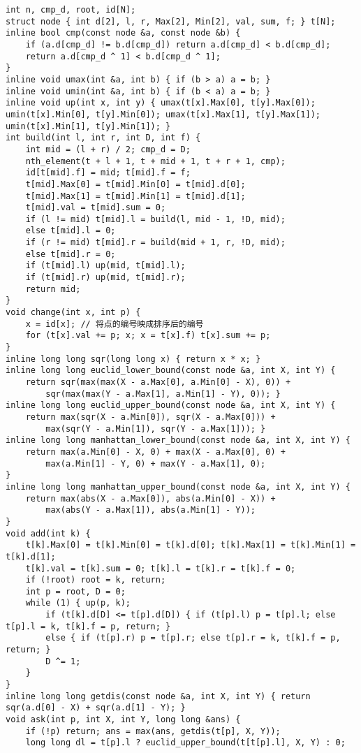 \documentclass[landscape,a4paper]{article}
\begin{document}
\begin{lstlisting}
int n, cmp_d, root, id[N];
struct node { int d[2], l, r, Max[2], Min[2], val, sum, f; } t[N];
inline bool cmp(const node &a, const node &b) {
	if (a.d[cmp_d] != b.d[cmp_d]) return a.d[cmp_d] < b.d[cmp_d];
	return a.d[cmp_d ^ 1] < b.d[cmp_d ^ 1];
}
inline void umax(int &a, int b) { if (b > a) a = b; }
inline void umin(int &a, int b) { if (b < a) a = b; }
inline void up(int x, int y) { umax(t[x].Max[0], t[y].Max[0]); umin(t[x].Min[0], t[y].Min[0]); umax(t[x].Max[1], t[y].Max[1]); umin(t[x].Min[1], t[y].Min[1]); }
int build(int l, int r, int D, int f) {
	int mid = (l + r) / 2; cmp_d = D;
	nth_element(t + l + 1, t + mid + 1, t + r + 1, cmp);
	id[t[mid].f] = mid; t[mid].f = f;
	t[mid].Max[0] = t[mid].Min[0] = t[mid].d[0];
	t[mid].Max[1] = t[mid].Min[1] = t[mid].d[1];
	t[mid].val = t[mid].sum = 0;
	if (l != mid) t[mid].l = build(l, mid - 1, !D, mid);
	else t[mid].l = 0;
	if (r != mid) t[mid].r = build(mid + 1, r, !D, mid);
	else t[mid].r = 0;
	if (t[mid].l) up(mid, t[mid].l);
	if (t[mid].r) up(mid, t[mid].r);
	return mid;
}
void change(int x, int p) {
	x = id[x]; // 将点的编号映成排序后的编号
	for (t[x].val += p; x; x = t[x].f) t[x].sum += p;
}
inline long long sqr(long long x) { return x * x; }
inline long long euclid_lower_bound(const node &a, int X, int Y) {
	return sqr(max(max(X - a.Max[0], a.Min[0] - X), 0)) +
		sqr(max(max(Y - a.Max[1], a.Min[1] - Y), 0)); }
inline long long euclid_upper_bound(const node &a, int X, int Y) {
	return max(sqr(X - a.Min[0]), sqr(X - a.Max[0])) +
		max(sqr(Y - a.Min[1]), sqr(Y - a.Max[1])); }
inline long long manhattan_lower_bound(const node &a, int X, int Y) {
	return max(a.Min[0] - X, 0) + max(X - a.Max[0], 0) + 
		max(a.Min[1] - Y, 0) + max(Y - a.Max[1], 0);
}
inline long long manhattan_upper_bound(const node &a, int X, int Y) {
	return max(abs(X - a.Max[0]), abs(a.Min[0] - X)) + 
		max(abs(Y - a.Max[1]), abs(a.Min[1] - Y));
}
void add(int k) {
	t[k].Max[0] = t[k].Min[0] = t[k].d[0]; t[k].Max[1] = t[k].Min[1] = t[k].d[1];
	t[k].val = t[k].sum = 0; t[k].l = t[k].r = t[k].f = 0;
	if (!root) root = k, return;
	int p = root, D = 0;
	while (1) { up(p, k);
		if (t[k].d[D] <= t[p].d[D]) { if (t[p].l) p = t[p].l; else t[p].l = k, t[k].f = p, return; }
		else { if (t[p].r) p = t[p].r; else t[p].r = k, t[k].f = p, return; } 
		D ^= 1;
	}
}
inline long long getdis(const node &a, int X, int Y) { return sqr(a.d[0] - X) + sqr(a.d[1] - Y); }
void ask(int p, int X, int Y, long long &ans) {
	if (!p) return; ans = max(ans, getdis(t[p], X, Y));
	long long dl = t[p].l ? euclid_upper_bound(t[t[p].l], X, Y) : 0;

\end{lstlisting}
\end{document}
